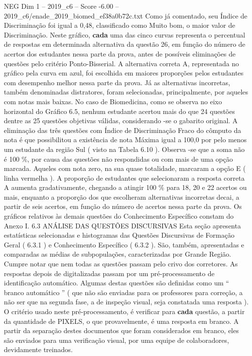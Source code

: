\begin{textsample}{NEG Dim 1 – 2019\_c6 – Score -6.00 – 2019\_c6/enade\_2019\_biomed\_ef38a0b72c.txt}
Como já comentado, seu Índice de Discriminação foi igual a 0,48, classificado como Muito bom, o maior valor de Discriminação.
Neste gráfico, \textbf{cada} uma das cinco curvas representa o percentual de respostas em determinada alternativa da questão 26, em função do número de acertos dos estudantes nessa parte da prova, antes de possíveis eliminações de questões pelo critério Ponto-Bisserial.
A alternativa correta A, representada no gráfico pela curva em azul, foi escolhida em maiores proporções pelos estudantes com desempenho melhor nessa parte da prova.
Já as alternativas incorretas, também denominadas distratores, foram selecionadas, principalmente, por aqueles com notas mais baixas.
No caso de Biomedicina, como se observa no eixo horizontal do Gráfico 6.5, nenhum estudante acertou mais do que 24 questões dentre as 25 questões objetivas válidas, considerando -se o gabarito original.
A eliminação das três questões com Índice de Discriminação Fraco do cômputo da nota é que possibilitou a existência de nota Máxima igual a 100,0 por pelo menos um estudante da região Sul ( visto na Tabela 6.10 ).
Observa -se que a soma não é 100 \%, por causa das questões não respondidas ou com mais de uma opção marcada.
Aqueles com nota zero, na sua quase totalidade, marcaram a opção E ( linha vermelha ).
A proporção de estudantes que selecionaram a resposta correta A aumenta gradativamente, chegando a atingir 100 \% para 18, 20 e 22 acertos ou mais, enquanto a proporção dos que escolheram alternativas incorretas decai, a partir de seis acertos, em função do número de acertos nessa parte da prova.
Os gráficos relativos às demais questões do Conhecimento Específico constam do Anexo I. 6.3 ANÁLISE DAS QUESTÕES DISCURSIVAS Esta seção apresenta estatísticas selecionadas e histogramas das Questões Discursivas de Formação Geral ( 6.3.1 ) e Conhecimento Específico ( 6.3.2 ).
São, também, apresentadas e comparadas as médias de subpopulações, caracterizadas por Grande Região.
Cumpre notar que nem todas as questões passam pelo crivo dos corretores.
As respostas depois de digitalizadas passam por um pré-processamento de identificação automático.
Algumas destas questões são definidas como um “ branco automático ” ( que não são enviadas para os professores para correção, a não ser que na segunda fase, a de inspeção visual, seja constatada uma resposta ).
O critério usado neste pré-processamento, é verificar para \textbf{cada} questão, a partir da quantidade de PIXELS, o que provavelmente, é uma resposta em branco.
A partir da separação destes documentos que foram considerados em branco, eles são enviados para uma verificação visual, por uma equipe de colaboradores, devidamente treinados.

\end{textsample}
